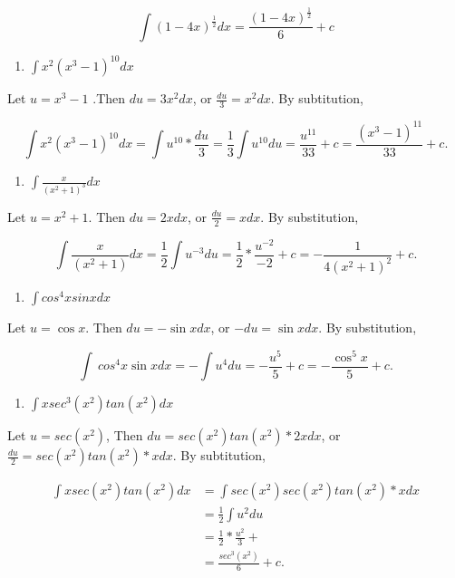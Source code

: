\documentclass[
  letterpaper,
  DIV=11,
  numbers=noendperiod]{scrartcl}
\providecommand{\tightlist}{%
  \setlength{\itemsep}{0pt}\setlength{\parskip}{0pt}}\usepackage{longtable,booktabs,array}
\theoremstyle{plain}
\theoremstyle{remark}
\begin{document}
\[
\int(1-4x)^\frac{1}{2}dx=\frac{(1-4x)^\frac{1}{2}}{6}+c
\]

\begin{enumerate}
\def\labelenumi{\arabic{enumi}.}
\setcounter{enumi}{1}
\tightlist
\item
  \(\int x^2(x^3-1)^{10}dx\)
\end{enumerate}

Let \(u=x^3-1\) .Then \(du=3x^2dx\), or \(\frac{du}{3}=x^2dx\). By
subtitution,

\[
\int x^2(x^3-1)^{10}dx= \int u^{10}*\frac{du}{3}=\frac{1}{3}\int u^{10}du= \frac{u^{11}}{33}+c= \frac{(x^3-1)^{11}}{33}+c.
\]

\begin{enumerate}
\def\labelenumi{\arabic{enumi}.}
\setcounter{enumi}{2}
\tightlist
\item
  \(\int\frac{x}{(x^2+1)^3}dx\)
\end{enumerate}

Let \(u=x^2+1\). Then \(du=2xdx\), or \(\frac{du}{2}=xdx\). By
substitution,

\[
\int \frac{x}{(x^2+1)}dx=\frac{1}{2}\int u^{-3}du= \frac{1}{2} * \frac{u^{-2}}{-2}+c= -\frac{1}{4(x^2+1)^2}+c.
\]

\begin{enumerate}
\def\labelenumi{\arabic{enumi}.}
\setcounter{enumi}{3}
\tightlist
\item
  \(\int cos^4 x sin x dx\)
\end{enumerate}

Let \(u=\cos x\). Then \(du=-\sin x dx\), or \(-du=\sin xdx\). By
substitution,

\[
\int\ cos^4 x\sin xdx=-\int u^4 du=-\frac{u^5}{5}+c=-\frac{\cos^5x}{5}+c.
\]

\begin{enumerate}
\def\labelenumi{\arabic{enumi}.}
\setcounter{enumi}{4}
\tightlist
\item
  \(\int xsec^3(x^2)tan(x^2)dx\)
\end{enumerate}

Let \(u=sec(x^2)\), Then \(du=sec(x^2) tan(x^2)*2xdx\), or
\(\frac{du}{2}=sec(x^2) tan(x^2) *xdx\). By subtitution,

\[
\begin{aligned}
\int xsec(x^2) tan(x^2)dx&=\int sec(x^2)sec(x^2)tan(x^2)*xdx\\&=\frac{1}{2}\int u^2du\\&=\frac{1}{2}*\frac{u^2}{3}+\\&=\frac{sec^3(x^2)}{6}+c.
\end{aligned}
\]
\end{document}
